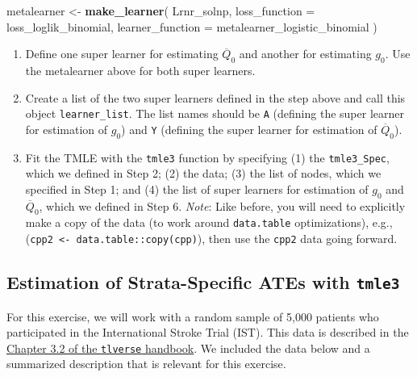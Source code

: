 \documentclass[12pt, krantz2,]{book}
\newenvironment{Shaded}{\begin{snugshade}}{\end{snugshade}}
\newcommand{\DataTypeTok}[1]{\textcolor[rgb]{0.13,0.29,0.53}{#1}}
\newcommand{\KeywordTok}[1]{\textcolor[rgb]{0.13,0.29,0.53}{\textbf{#1}}}
\newcommand{\NormalTok}[1]{#1}
\newcommand{\StringTok}[1]{\textcolor[rgb]{0.31,0.60,0.02}{#1}}
\providecommand{\tightlist}{%
  \setlength{\itemsep}{0pt}\setlength{\parskip}{0pt}}
\theoremstyle{definition}
\theoremstyle{definition}
\theoremstyle{definition}
\newcommand{\1}{\mathbbm{1}}
\begin{document}
\begin{Shaded}
\begin{Highlighting}[]
\NormalTok{metalearner <-}\StringTok{ }\KeywordTok{make_learner}\NormalTok{(}
\NormalTok{  Lrnr_solnp,}
  \DataTypeTok{loss_function =}\NormalTok{ loss_loglik_binomial,}
  \DataTypeTok{learner_function =}\NormalTok{ metalearner_logistic_binomial}
\NormalTok{)}
\end{Highlighting}
\end{Shaded}

\begin{enumerate}
\def\labelenumi{\arabic{enumi}.}
\setcounter{enumi}{4}
\tightlist
\item
  Define one super learner for estimating \(\overline{Q}_0\) and another for
  estimating \(g_0\). Use the metalearner above for both super learners.
\item
  Create a list of the two super learners defined in the step above and call
  this object \texttt{learner\_list}. The list names should be \texttt{A} (defining the super
  learner for estimation of \(g_0\)) and \texttt{Y} (defining the super learner for
  estimation of \(\overline{Q}_0\)).
\item
  Fit the TMLE with the \texttt{tmle3} function by specifying (1) the \texttt{tmle3\_Spec},
  which we defined in Step 2; (2) the data; (3) the list of nodes, which we
  specified in Step 1; and (4) the list of super learners for estimation of
  \(g_0\) and \(\overline{Q}_0\), which we defined in Step 6. \emph{Note}: Like before,
  you will need to explicitly make a copy of the data (to work around
  \texttt{data.table} optimizations), e.g., (\texttt{cpp2\ \textless{}-\ data.table::copy(cpp)}), then
  use the \texttt{cpp2} data going forward.
\end{enumerate}

\hypertarget{tmle3-ex2}{%
\subsection{\texorpdfstring{Estimation of Strata-Specific ATEs with \texttt{tmle3}}{Estimation of Strata-Specific ATEs with tmle3}}\label{tmle3-ex2}}

For this exercise, we will work with a random sample of 5,000 patients who
participated in the International Stroke Trial (IST). This data is described in
the \protect\hyperlink{ist}{Chapter 3.2 of the \texttt{tlverse} handbook}. We included the data below
and a summarized description that is relevant for this exercise.
\end{document}
